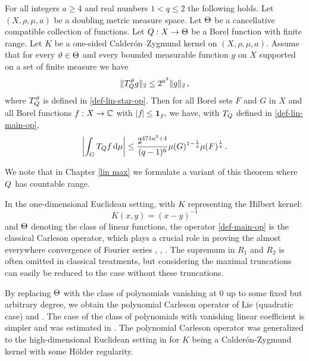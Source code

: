 \begin{theorem}
\label{linearised-metric-Carleson}
\leanok
{}
    For all integers $a \ge 4$ and real numbers $1<q\le 2$ the following holds.
    Let $(X,\rho,\mu,a)$ be a doubling metric measure space. Let ${\Theta}$ be a
    cancellative compatible collection of functions.
    Let ${Q}:X\to {\Theta}$ be a Borel function with finite range.
    Let $K$ be a one-sided Calder\'on--Zygmund kernel on $(X,\rho,\mu,a)$. Assume that for every ${\vartheta}\in {\Theta}$ and every bounded measurable function $g$ on $X$ supported on a set of finite measure we have
    \begin{equation}\label{linnontanbound}
        \|T_{{Q}}^{\vartheta} g\|_{2} \leq 2^{a^3} \|g\|_2\,,
    \end{equation}
    where $T_{{Q}}^{\vartheta}$ is defined in \eqref{def-lin-star-op}.
    Then for all Borel sets $F$ and $G$ in $X$ and all Borel functions $f:X\to \mathbb{C}$ with
    $|f|\le \mathbf{1}_F$, we have, with $T_{Q}$ defined in \eqref{def-lin-main-op},
    \begin{equation}
        \label{linresweak}
        \left|\int_{G} T_{Q} f \, \mathrm{d}\mu\right| \le \frac{2^{471a^3+4}}{(q-1)^6} \mu(G)^{1-\frac{1}{q}} \mu(F)^{\frac{1}{q}}\, .
    \end{equation}
\end{theorem}

We note that in Chapter \ref{lin max} we formulate a variant of this theorem where
${Q}$ has countable range.

In the one-dimensional Euclidean setting, with $K$ representing the Hilbert kernel:
\begin{equation*}
    K(x,y)=(x-y)^{-1}
\end{equation*}
and ${\Theta}$ denoting the class of linear functions, the operator \eqref{def-main-op} is the classical Carleson operator, which plays a crucial role in proving the almost everywhere convergence of Fourier series \cite{carleson}, \cite{fefferman}, \cite{lacey-thiele}. The supremum in $R_1$ and $R_2$ is often omitted in classical treatments, but considering the maximal truncations can easily be reduced to the case without these truncations.

By replacing ${\Theta}$ with the class of polynomials vanishing at $0$ up to some fixed but arbitrary degree, we obtain the polynomial Carleson operator of Lie \cite{lie-quadratic} (quadratic case) and \cite{lie-polynomial}. The case of the class of polynomials with vanishing linear coefficient is simpler and was estimated in \cite{stein-wainger}. The polynomial Carleson operator was generalized to the high-dimensional Euclidean setting in \cite{zk-polynomial} for $K$ being a Calder\'on-Zygmund kernel with some H\"older regularity.


